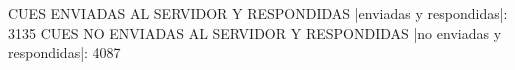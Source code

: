 CUES ENVIADAS AL SERVIDOR Y RESPONDIDAS
|enviadas y respondidas|: 3135
CUES NO ENVIADAS AL SERVIDOR Y RESPONDIDAS
|no enviadas y respondidas|: 4087